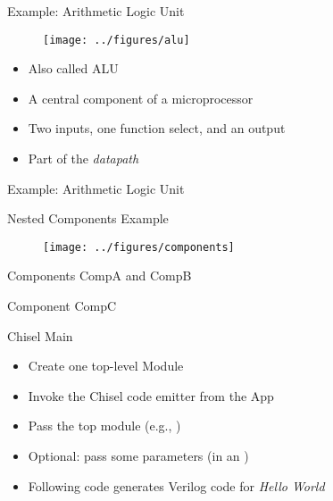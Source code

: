 \begin{frame}[fragile]{Example: Arithmetic Logic Unit}
\begin{figure}
  \texttt{[image: ../figures/alu]}
\end{figure}
\begin{itemize}
\item Also called ALU
\item A central component of a microprocessor
\item Two inputs, one function select, and an output
\item Part of the \emph{datapath}
\end{itemize}
\end{frame}

\begin{frame}[fragile]{Example: Arithmetic Logic Unit}
\end{frame}



\begin{frame}[fragile]{Nested Components Example}
\begin{figure}
  \texttt{[image: ../figures/components]}
\end{figure}
\end{frame}

\begin{frame}[fragile]{Components CompA and CompB}
\end{frame}

\begin{frame}[fragile]{Component CompC}
\end{frame}



\begin{frame}[fragile]{Chisel Main}

\begin{itemize}
\item Create one top-level Module
\item Invoke the Chisel code emitter from the App
\item Pass the top module (e.g., )
\item Optional: pass some parameters (in an )
\item Following code generates Verilog code for \emph{Hello World}
\end{itemize}
\end{frame}

